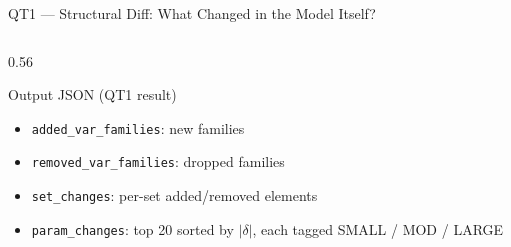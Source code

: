 \documentclass[aspectratio=169,10pt]{beamer}
\begin{document}
\begin{frame}[t]{QT1 — Structural Diff: What Changed in the Model Itself?}
\begin{columns}[T]
\begin{column}{0.56\textwidth}
    \begin{block}{Output JSON (QT1 result)}
      \begin{itemize}\setlength\itemsep{1pt}
        \item \texttt{added\_var\_families}: new families
        \item \texttt{removed\_var\_families}: dropped families
        \item \texttt{set\_changes}: per-set added/removed elements
        \item \texttt{param\_changes}: top 20 sorted by $|\delta|$,
              each tagged SMALL / MOD / LARGE
      \end{itemize}
    \end{block}
    \vspace{4pt}
  \end{column}
\end{columns}
\end{frame}
\end{document}
